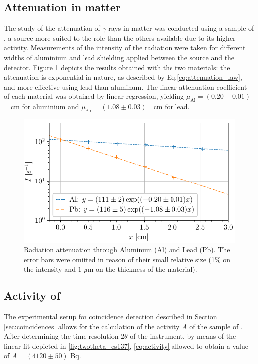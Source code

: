 \subsection{Attenuation in matter}
The study of the attenuation of $\gamma$ rays in matter was conducted using 
a sample of \cesium, a source more suited to the role than 
the others available due to its higher activity.
Measurements of the intensity of the radiation were taken for
different widths of aluminium and lead shielding applied 
between the source and the detector.
Figure \ref{fig:attenuation_coefficient} depicts the results obtained with 
the two materials:
the attenuation is exponential in nature, as described 
by Eq.\eqref{eq:attenuation_law}, and more effective using lead than aluminum.
The linear attenuation coefficient of each material was obtained by linear regression, yielding \mbox{$\mu_{\mathrm{Al}} = (0.20 \pm 0.01)$ \unit{\per\cm}} for aluminium
and \mbox{$\mu_{\mathrm{Pb}} = (1.08 \pm 0.03)$ \unit{\per\cm}} for lead.
\begin{figure}[htbp]
    \centering
    \includegraphics[scale=1]{figures/attenuation_coefficient.pdf}
    \caption{Radiation attenuation through Aluminum (Al) and Lead (Pb). 
             The error bars were omitted in reason of their small relative size 
             (1\% on the intensity and $1$ $\mu$m on the thickness of the material).}
    \label{fig:attenuation_coefficient}
\end{figure}


\subsection{Activity of \cobalt}
The experimental setup for coincidence detection described 
in Section \ref{sec:coincidences} allows for the calculation
of the activity $A$ of the sample of \cobalt.
After determining the time resolution $2\theta$ of 
the instrument, by means of the linear fit depicted in
\autoref{fig:twotheta_cs137}, \autoref{eq:activity} allowed 
to obtain a value of $A= (4120 \pm 50)$ Bq.

